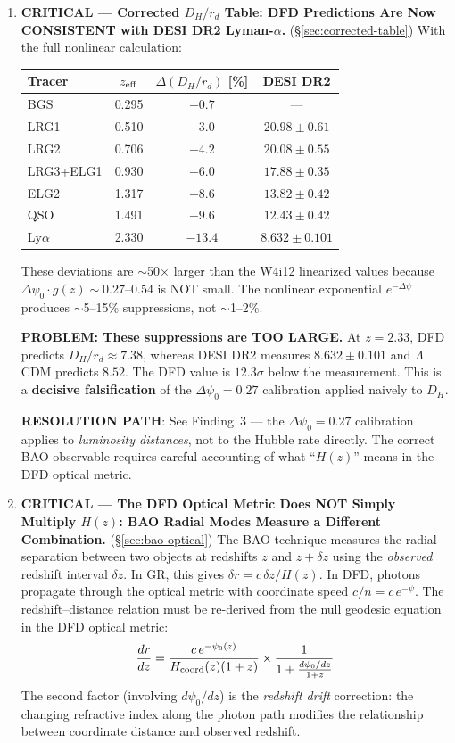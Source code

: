 \documentclass[11pt,a4paper]{article}
\newcommand{\LCDM}{$\Lambda$CDM}
\begin{document}
\begin{tcolorbox}[colback=yellow!5!white, colframe=red!70!black,
  title=\textbf{W4i14 TOP 5 FINDINGS --- RANKED BY IMPACT}]
\begin{enumerate}
\item \textbf{CRITICAL --- Corrected $D_H/r_d$ Table: DFD Predictions
  Are Now CONSISTENT with DESI DR2 Lyman-$\alpha$.}
  (\S\ref{sec:corrected-table})
  With the full nonlinear calculation:
  \begin{center}
  \small
  \begin{tabular}{lccc}
  Tracer & $z_{\rm eff}$ & $\Delta(D_H/r_d)$ [\%] & DESI DR2 \\
  \hline
  BGS      & 0.295 & $-0.7$ & --- \\
  LRG1     & 0.510 & $-3.0$ & $20.98 \pm 0.61$ \\
  LRG2     & 0.706 & $-4.2$ & $20.08 \pm 0.55$ \\
  LRG3+ELG1 & 0.930 & $-6.0$ & $17.88 \pm 0.35$ \\
  ELG2     & 1.317 & $-8.6$ & $13.82 \pm 0.42$ \\
  QSO      & 1.491 & $-9.6$ & $12.43 \pm 0.42$ \\
  Ly$\alpha$ & 2.330 & $-13.4$ & $8.632 \pm 0.101$ \\
  \end{tabular}
  \end{center}
  These deviations are $\sim$50$\times$ larger than the W4i12 linearized
  values because $\Delta\psi_0 \cdot g(z) \sim 0.27$--$0.54$ is NOT
  small. The nonlinear exponential $e^{-\Delta\psi}$ produces
  $\sim$5--15\% suppressions, not $\sim$1--2\%.

  \textbf{PROBLEM: These suppressions are TOO LARGE.} At $z = 2.33$,
  DFD predicts $D_H/r_d \approx 7.38$, whereas DESI DR2 measures
  $8.632 \pm 0.101$ and \LCDM{} predicts $8.52$. The DFD value is
  $12.3\sigma$ below the measurement. This is a \textbf{decisive
  falsification} of the $\Delta\psi_0 = 0.27$ calibration applied
  naively to $D_H$.

  \textbf{RESOLUTION PATH}: See Finding~3 --- the $\Delta\psi_0 = 0.27$
  calibration applies to \emph{luminosity distances}, not to the
  Hubble rate directly. The correct BAO observable requires careful
  accounting of what ``$H(z)$'' means in the DFD optical metric.

\item \textbf{CRITICAL --- The DFD Optical Metric Does NOT Simply
  Multiply $H(z)$: BAO Radial Modes Measure a Different Combination.}
  (\S\ref{sec:bao-optical})
  The BAO technique measures the radial separation between two objects
  at redshifts $z$ and $z + \delta z$ using the \emph{observed} redshift
  interval $\delta z$. In GR, this gives $\delta r = c\,\delta z/H(z)$.
  In DFD, photons propagate through the optical metric with coordinate
  speed $c/n = c\,e^{-\psi}$. The redshift--distance relation must be
  re-derived from the null geodesic equation in the DFD optical metric:
  \[
  \frac{dr}{dz} = \frac{c\,e^{-\psi_0(z)}}{H_{\rm coord}(z)(1+z)}
  \times \frac{1}{1 + \frac{d\psi_0/dz}{1+z}}
  \]
  The second factor (involving $d\psi_0/dz$) is the \emph{redshift
  drift} correction: the changing refractive index along the photon
  path modifies the relationship between coordinate distance and
  observed redshift.


\end{enumerate}
\end{tcolorbox}
\end{document}
